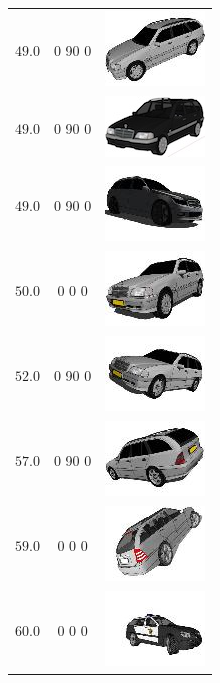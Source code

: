 \documentclass{llncs}
\begin{document}
\begin{longtable}{ccc}
  	$49.0$ & 0 90 0 & \includegraphics{models/1c5a350ea0f55f793fbce9ec40e1f047.jpg}\\
  	$49.0$ & 0 90 0 & \includegraphics{models/689346b4812ead699bdae02f855f706c.jpg}\\
  	$49.0$ & 0 90 0 & \includegraphics{models/875bc6efc7f33c052e877e82c90c24d.jpg}\\
  	$50.0$ & 0 0 0 & \includegraphics{models/a43971c2beee03403fbce9ec40e1f047.jpg}\\
  	$52.0$ & 0 90 0 & \includegraphics{models/618e8b78bfa803dab1bb46d2556ba67d.jpg}\\
  	$57.0$ & 0 90 0 & \includegraphics{models/eb5a5eb751cca94a3fbce9ec40e1f047.jpg}\\
  	$59.0$ & 0 0 0 & \includegraphics{models/a0c60115f83f1f77b1bb46d2556ba67d.jpg}\\
  	$60.0$ & 0 0 0 & \includegraphics{models/5bab0881b7a18b12733269057ed164db.jpg}\\

\end{longtable}
\end{document}

